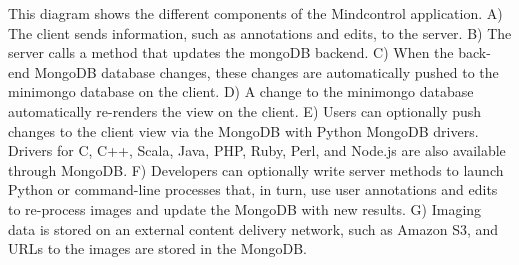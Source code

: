 \label{fig:appstructure}

This diagram shows the different components of the Mindcontrol application. A) The client sends information, such as annotations and edits, to the server. B) The server calls a method that updates the mongoDB backend. C) When the back-end MongoDB database changes, these changes are automatically pushed to the minimongo database on the client. D) A change to the minimongo database automatically re-renders the view on the client. E) Users can optionally push changes to the client view via the MongoDB with Python MongoDB drivers. Drivers for C, C++, Scala, Java, PHP, Ruby, Perl, and Node.js are also available through MongoDB. F) Developers can optionally write server methods to launch Python or command-line processes that, in turn, use user annotations and edits to re-process images and update the MongoDB with new results. G) Imaging data is stored on an external content delivery network, such as Amazon S3, and URLs to the images are stored in the MongoDB.